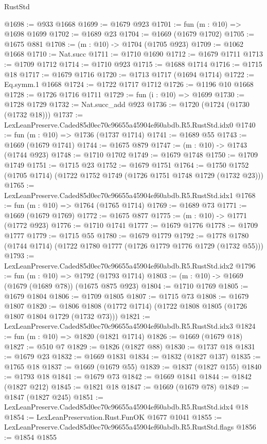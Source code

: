 \begin{lexlean}{RustStd}
\begin{coremodule}
@1698 := @933 @1668
@1699 := @1679 @923
@1701 := fun (m : @10) => @1698 @1699
@1702 := @1689 @23
@1704 := @1669 (@1679 @1702)
@1705 := @1675 @881
@1708 := (m : @10) -> @1704 (@1705 @923)
@1709 := @1062 @1668
@1710 := Nat.succ
@1711 := @1710 @1690
@1712 := @1679 @1711
@1713 := @1709 @1712
@1714 := @1710 @923
@1715 := @1688 @1714
@1716 := @1715 @18
@1717 := @1679 @1716
@1720 := @1713 @1717 (@1694 @1714)
@1722 := Eq.symm.{1} @1668
@1724 := @1722 @1717 @1712
@1726 := @1196 @10 @1668
@1728 := @1726 @1716 @1711
@1729 := fun (i : @10) => @1699
@1730 := @1728 @1729
@1732 := Nat.succ_add @923
@1736 := @1720 (@1724 (@1730 (@1732 @18)))
@1737 := LexLeanPreserve.Caded85d0ec70c96655a45904ef60abdb.R5.RustStd.idx0
@1740 := fun (m : @10) => @1736 (@1737 @1714)
@1741 := @1689 @55
@1743 := @1669 (@1679 @1741)
@1744 := @1675 @879
@1747 := (m : @10) -> @1743 (@1744 @923)
@1748 := @1710 @1702
@1749 := @1679 @1748
@1750 := @1709 @1749
@1751 := @1715 @23
@1752 := @1679 @1751
@1764 := @1750 @1752 (@1705 @1714) (@1722 @1752 @1749 (@1726 @1751 @1748 @1729 (@1732 @23)))
@1765 := LexLeanPreserve.Caded85d0ec70c96655a45904ef60abdb.R5.RustStd.idx1
@1768 := fun (m : @10) => @1764 (@1765 @1714)
@1769 := @1689 @73
@1771 := @1669 (@1679 @1769)
@1772 := @1675 @877
@1775 := (m : @10) -> @1771 (@1772 @923)
@1776 := @1710 @1741
@1777 := @1679 @1776
@1778 := @1709 @1777
@1779 := @1715 @55
@1780 := @1679 @1779
@1792 := @1778 @1780 (@1744 @1714) (@1722 @1780 @1777 (@1726 @1779 @1776 @1729 (@1732 @55)))
@1793 := LexLeanPreserve.Caded85d0ec70c96655a45904ef60abdb.R5.RustStd.idx2
@1796 := fun (m : @10) => @1792 (@1793 @1714)
@1803 := (m : @10) -> @1669 (@1679 (@1689 @78)) (@1675 @875 @923)
@1804 := @1710 @1769
@1805 := @1679 @1804
@1806 := @1709 @1805
@1807 := @1715 @73
@1808 := @1679 @1807
@1820 := @1806 @1808 (@1772 @1714) (@1722 @1808 @1805 (@1726 @1807 @1804 @1729 (@1732 @73)))
@1821 := LexLeanPreserve.Caded85d0ec70c96655a45904ef60abdb.R5.RustStd.idx3
@1824 := fun (m : @10) => @1820 (@1821 @1714)
@1826 := @1669 (@1679 @18)
@1827 := @510 @7
@1829 := @1826 (@1827 @88)
@1830 := @1737 @18
@1831 := @1679 @23
@1832 := @1669 @1831
@1834 := @1832 (@1827 @137)
@1835 := @1765 @18
@1837 := @1669 (@1679 @55)
@1839 := @1837 (@1827 @155)
@1840 := @1793 @18
@1841 := @1679 @73
@1842 := @1669 @1841
@1844 := @1842 (@1827 @212)
@1845 := @1821 @18
@1847 := @1669 (@1679 @78)
@1849 := @1847 (@1827 @245)
@1851 := LexLeanPreserve.Caded85d0ec70c96655a45904ef60abdb.R5.RustStd.idx4 @18
@1854 := LexLeanPreservation.Rust.FunOK @1677 @1041
@1855 := LexLeanPreserve.Caded85d0ec70c96655a45904ef60abdb.R5.RustStd.flags
@1856 := @1854 @1855

\end{coremodule}
\end{lexlean}
